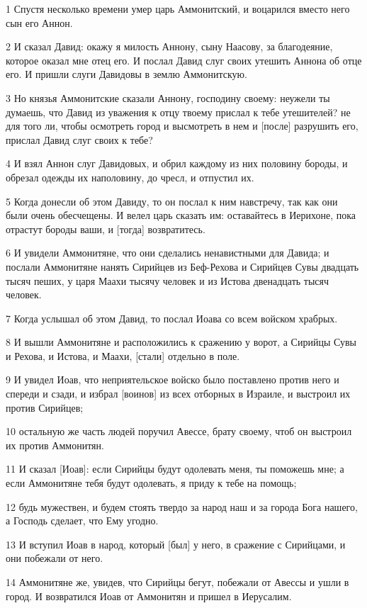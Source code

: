 \par 1 Спустя несколько времени умер царь Аммонитский, и воцарился вместо него сын его Аннон.
\par 2 И сказал Давид: окажу я милость Аннону, сыну Наасову, за благодеяние, которое оказал мне отец его. И послал Давид слуг своих утешить Аннона об отце его. И пришли слуги Давидовы в землю Аммонитскую.
\par 3 Но князья Аммонитские сказали Аннону, господину своему: неужели ты думаешь, что Давид из уважения к отцу твоему прислал к тебе утешителей? не для того ли, чтобы осмотреть город и высмотреть в нем и [после] разрушить его, прислал Давид слуг своих к тебе?
\par 4 И взял Аннон слуг Давидовых, и обрил каждому из них половину бороды, и обрезал одежды их наполовину, до чресл, и отпустил их.
\par 5 Когда донесли об этом Давиду, то он послал к ним навстречу, так как они были очень обесчещены. И велел царь сказать им: оставайтесь в Иерихоне, пока отрастут бороды ваши, и [тогда] возвратитесь.
\par 6 И увидели Аммонитяне, что они сделались ненавистными для Давида; и послали Аммонитяне нанять Сирийцев из Беф-Рехова и Сирийцев Сувы двадцать тысяч пеших, у царя Маахи тысячу человек и из Истова двенадцать тысяч человек.
\par 7 Когда услышал об этом Давид, то послал Иоава со всем войском храбрых.
\par 8 И вышли Аммонитяне и расположились к сражению у ворот, а Сирийцы Сувы и Рехова, и Истова, и Маахи, [стали] отдельно в поле.
\par 9 И увидел Иоав, что неприятельское войско было поставлено против него и спереди и сзади, и избрал [воинов] из всех отборных в Израиле, и выстроил их против Сирийцев;
\par 10 остальную же часть людей поручил Авессе, брату своему, чтоб он выстроил их против Аммонитян.
\par 11 И сказал [Иоав]: если Сирийцы будут одолевать меня, ты поможешь мне; а если Аммонитяне тебя будут одолевать, я приду к тебе на помощь;
\par 12 будь мужествен, и будем стоять твердо за народ наш и за города Бога нашего, а Господь сделает, что Ему угодно.
\par 13 И вступил Иоав в народ, который [был] у него, в сражение с Сирийцами, и они побежали от него.
\par 14 Аммонитяне же, увидев, что Сирийцы бегут, побежали от Авессы и ушли в город. И возвратился Иоав от Аммонитян и пришел в Иерусалим.
